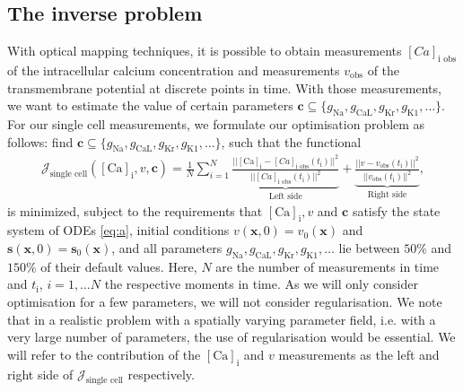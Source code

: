 \documentclass{article}
\begin{document}
\subsection{The inverse problem} \label{The inverse problem}
With optical mapping techniques, it is possible to obtain measurements $[Ca]_{\text{i obs}}$ of the intracellular calcium concentration and measurements $v_{\text{obs}}$ of the transmembrane potential at discrete points in time. With those measurements, we want to estimate the value of certain parameters $\boldsymbol{c}\subseteq \{g_{\mathrm{Na}}, g_{\mathrm{CaL}}, g_{\mathrm{Kr}}, g_{\mathrm{K1}}, \ldots \}$. For our single cell measurements, we formulate our optimisation problem as follows: find $\boldsymbol{c} \subseteq\{ g_{\mathrm{Na}}, g_{\mathrm{CaL}}, g_{\mathrm{Kr}}, g_{\mathrm{K1}}, \ldots \}$, such that the functional
\begin{eqnarray}
\mathcal{J}_{\text{single cell}}([\mathrm{Ca}]_{\mathrm{i}},v, \boldsymbol{c}) = \frac{1}{N} \sum_{i=1}^{N} \underbrace{\frac{||[\mathrm{Ca}]_{\mathrm{i}}-[Ca]_{\text{i obs}}(t_{\mathrm{i}}) ||^2}{||[Ca]_{\text{i obs}}(t_{\mathrm{i}}) ||^2}}_{\text{Left side}} + \underbrace{\frac{||v-v_{\text{obs}}(t_{\mathrm{i}})||^2}{||v_{\text{obs}}(t_{\mathrm{i}})||^2}}_{\text{Right side}}, \label{J_s}
\end{eqnarray}
is minimized, subject to the requirements that $[\mathrm{Ca}]_{\mathrm{i}}, v$ and $\boldsymbol{c}$ satisfy the state system of ODEs \eqref{eq:a}, initial conditions $v(\textbf{x},0)=v_0(\textbf{x})$ and $\mathbf{s}(\mathbf{x},0)=\mathbf{s}_0(\mathbf{x})$, and all parameters $g_{\mathrm{Na}}, g_{\mathrm{CaL}}, g_{\mathrm{Kr}}, g_{\mathrm{K1}}, \ldots$ lie between $50\%$ and $150\%$ of their default values. Here, $N$ are the number of measurements in time and $t_{\mathrm{i}}$, $i=1, \dots N$ the respective moments in time. As we will only consider optimisation for a few parameters, we will not consider regularisation. We note that in a realistic problem with a spatially varying parameter field, i.e. with a very large number of parameters, the use of regularisation would be essential. We will refer to the contribution of the $[\mathrm{Ca}]_{\mathrm{i}}$ and $v$ measurements as the left and right side of $\mathcal{J}_{\text{single cell}}$ respectively.
\end{document}
